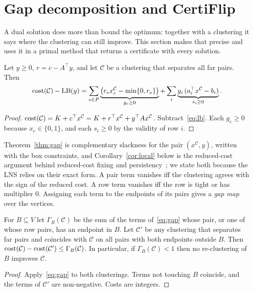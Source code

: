 \section{Gap decomposition and CertiFlip}\label{sec:gap}

A dual solution does more than bound the optimum: together with a clustering
it says where the clustering can still improve.  This section makes that
precise and uses it in a primal method that returns a certificate with every
solution.


\begin{theorem}\label{thm:gap}
Let $y\ge0$, $r=c-A^\top y$, and let $\mathcal C$ be a clustering that separates all
far pairs.  Then
\begin{equation}\label{eq:gap}
\mathrm{cost}(\mathcal C)-\mathrm{LB}(y)=\sum_{e\in P}\underbrace{\big(r_ex^{\mathcal C}_e-\min\{0,r_e\}\big)}_{g_e\ge0}
+\sum_i\underbrace{y_i\,(a_i^\top x^{\mathcal C}-b_i)}_{s_i\ge0}.
\end{equation}
\end{theorem}
\begin{proof}
$\mathrm{cost}(\mathcal C)=K+c^\top x^{\mathcal C}=K+r^\top x^{\mathcal C}+y^\top
Ax^{\mathcal C}$.  Subtract~\eqref{eq:lb}.  Each $g_e\ge0$ because
$x_e\in\{0,1\}$, and each $s_i\ge0$ by the validity of row $i$.
\end{proof}

Theorem~\ref{thm:gap} is complementary slackness for the pair
$(x^{\mathcal C},y)$, written with the box constraints, and
Corollary~\ref{cor:local} below is the reduced-cost argument behind
reduced-cost fixing and persistency~\citep{lange2018partial}; we state both
because the LNS relies on their exact form.  A pair term vanishes iff the
clustering agrees with the sign of the reduced cost.  A row term vanishes iff
the row is tight or has multiplier $0$.
Assigning each term to the endpoints of its pairs gives a \emph{gap map} over
the vertices.

\begin{corollary}\label{cor:local}
For $B\subseteq V$ let $\Gamma_B(\mathcal C)$ be the sum of the terms
of~\eqref{eq:gap} whose pair, or one of whose row pairs, has an endpoint in
$B$.  Let $\mathcal C'$ be any clustering that separates far pairs and
coincides with $\mathcal C$ on all pairs with both endpoints outside $B$.  Then
$\mathrm{cost}(\mathcal C)-\mathrm{cost}(\mathcal C')\le\Gamma_B(\mathcal C)$.  In particular,
if $\Gamma_B(\mathcal C)<1$ then no re-clustering of $B$ improves $\mathcal C$.
\end{corollary}
\begin{proof}
Apply~\eqref{eq:gap} to both clusterings.  Terms not touching $B$ coincide,
and the terms of $\mathcal C'$ are non-negative.  Costs are integers.
\end{proof}

